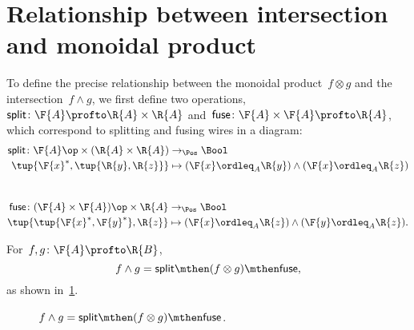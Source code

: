 \section{Relationship between intersection and monoidal product}
To define the precise relationship between the monoidal product~$f \otimes g$  and the intersection~$f \wedge g$, we first define two operations,~$\mathsf{split} \colon \F{A} \profto \R{A} \times \R{A}$ and~$\mathsf{fuse} \colon \F{A} \times \F{A} \profto \R{A}$, which correspond to splitting and fusing wires in a diagram:
\begin{equation}
    \begin{aligned}
        \mathsf{split} \colon \F{A}\op \times (\R{A} \times \R{A}) & \to_\Pos \Bool \\
        \tup{\F{x}^*, \tup{\R{y}, \R{z}}}                          & \mapsto (\F{x} \ordleq_A \R{y}) \wedge (\F{x} \ordleq_A \R{z})
    \end{aligned}
\end{equation}
~
\begin{equation}
    \begin{aligned}
        \mathsf{fuse} \colon (\F{A} \times \F{A})\op \times \R{A} & \to_\Pos \Bool \\
        \tup{ \tup{\F{x}^*, \F{y}^*}, \R{z}}                      & \mapsto (\F{x} \ordleq_A \R{z}) \wedge (\F{y} \ordleq_A \R{z}).
    \end{aligned}
\end{equation}

\begin{lemma}
    \label{lem:intersection_split}
    For~$f,g \colon \F{A} \profto \R{B}$,
    \begin{equation}
        f \wedge g = \mathsf{split} \mthen (f \otimes g) \mthen \mathsf{fuse},
    \end{equation}
    as shown in~\cref{fig:lemmasplitfuse}.
    \begin{figure}[h!]
        \begin{center}
        \end{center}
        \caption{$f \wedge g = \mathsf{split} \mthen (f \otimes g) \mthen \mathsf{fuse}$. }
        \label{fig:lemmasplitfuse}
    \end{figure}
\end{lemma}

